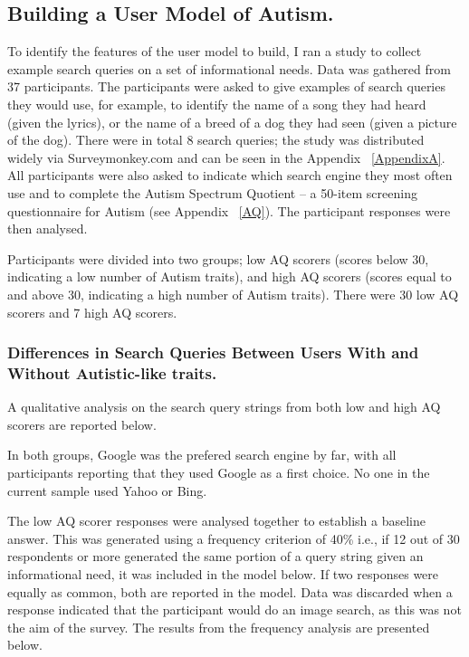 \documentclass[a4paper, 11pt]{article}
\begin{document}
\subsection{Building a User Model of Autism.}
To identify the features of the user model to build, I ran a study to collect example search queries on a set of informational needs. Data was gathered from 37 participants. The participants were asked to give examples of search queries they would use, for example, to identify the name of a song they had heard (given the lyrics), or the name of a breed of a dog they had seen (given a picture of the dog). There were in total 8 search queries; the study was distributed widely via Surveymonkey.com \cite{surveymonkey} and can be seen in the Appendix ~\ref{AppendixA}. All participants were also asked to indicate which search engine they most often use and to complete the Autism Spectrum Quotient -- a 50-item screening questionnaire for Autism (see Appendix ~\ref{AQ}). The participant responses were then analysed.


\vspace{5mm}
Participants were divided into two groups; low AQ scorers (scores below 30, indicating a low number of Autism traits), and high AQ scorers (scores equal to and above 30, indicating a high number of Autism traits). There were 30 low AQ scorers and 7 high AQ scorers. 


\subsubsection{Differences in Search Queries Between Users With and Without Autistic-like traits.}
A qualitative analysis on the search query strings from both low and high AQ scorers are reported below.

\vspace{5mm}
In both groups, Google was the prefered search engine by far, with all participants reporting that they used Google as a first choice. No one in the current sample used Yahoo or Bing.

\vspace{5mm} 
The low AQ scorer responses were analysed together to establish a baseline answer. This was generated using a frequency criterion of 40\% i.e., if 12 out of 30 respondents or more generated the same portion of a query string given an informational need, it was included in the model below. If two responses were equally as common, both are reported in the model. Data was discarded when a response indicated that the participant would do an image search, as this was not the aim of the survey. The results from the frequency analysis are presented below.
\end{document}
